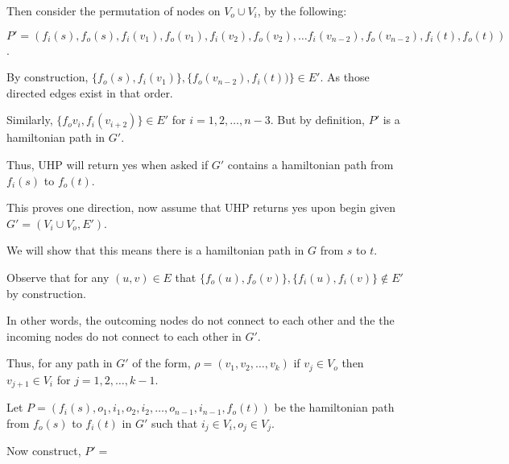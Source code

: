 \begin{questions}
\begin{soln}
		Then consider the permutation of nodes on \(V_o \cup V_i\), by the following:

		\(P' = (f_i(s), f_o(s), f_i(v_1), f_o(v_1), f_i(v_2), f_o(v_2), \dots f_i(v_{n-2}), f_o(v_{n-2}), f_i(t), f_o(t))\).

		By construction, \(\{f_o(s), f_i(v_1)\}, \{f_o(v_{n-2}), f_i(t))\} \in E'\). As those directed edges exist in that order.

		Similarly, \(\{f_o{v_i}, f_i(v_{i+2})\} \in E'\) for \(i = 1, 2, \dots, n - 3\). But by definition, \(P'\) is a hamiltonian path in \(G'\).

		Thus, UHP will return yes when asked if \(G'\) contains a hamiltonian path from \(f_i(s)\) to \(f_o(t)\).

		This proves one direction, now assume that UHP returns yes upon begin given \(G' = (V_i \cup V_o, E')\).

		We will show that this means there is a hamiltonian path in \(G\) from \(s\) to \(t\).

		Observe that for any \((u, v) \in E\) that \(\{f_o(u),f_o(v)\}, \{f_i(u), f_i(v)\} \notin E'\) by construction.

		In other words, the outcoming nodes do not connect to each other and the the incoming nodes do not connect to each other in \(G'\).

		Thus, for any path in \(G'\) of the form, \(\rho = (v_1,v_2, \dots, v_k)\) if \(v_j \in V_o\) then \(v_{j+1} \in V_i\) for \(j = 1, 2, \dots, k - 1\).

		Let \(P = (f_i(s), o_1, i_1, o_2, i_2, \dots, o_{n-1}, i_{n-1}, f_o(t))\) be the hamiltonian path from \(f_o(s)\) to \(f_i(t)\) in \(G'\) such that \(i_j \in V_i, o_j \in V_j\).

		Now construct, \(P' = \)





	\end{soln}


\end{questions}
